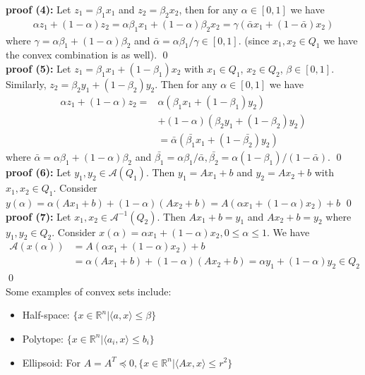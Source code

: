 \documentclass[12pt,a4paper]{article}
\begin{document}
	\textbf{proof (4):} Let $z_1 = \beta_1x_1$ and $z_2 = \beta_2x_2$, then for any $\alpha \in [0,1]$ we have
	\begin{align*}
		\alpha z_1 + (1 - \alpha)z_2 = \alpha \beta_1x_1 + (1 - \alpha)\beta_2x_2 = \gamma(\bar{\alpha}x_1 + (1 - \bar{\alpha})x_2)
	\end{align*}
	where $\gamma = \alpha \beta_1 + (1 - \alpha)\beta_2$ and $\bar{\alpha} = \alpha \beta_1 / \gamma \in [0,1]$. (since $x_1, x_2 \in Q_1$ we have the convex combination is as well). \qed \\
	\textbf{proof (5):} Let $z_1 = \beta_1x_1 + (1 - \beta_1)x_2$ with $x_1 \in Q_1$, $x_2 \in Q_2$, $\beta \in [0,1]$. Similarly, $z_2 = \beta_2y_1 + (1 - \beta_2)y_2$. Then for any $\alpha \in [0,1]$ we have
	\begin{align*}
		\alpha z_1 + (1 - \alpha)z_2 = &\alpha(\beta_1x_1 + (1 - \beta_1)y_2) \\
		&+ (1 - \alpha)(\beta_2y_1 + (1 - \beta_2)y_2) \\
		&= \bar{\alpha}(\bar{\beta_1}x_1 + (1 - \bar{\beta_2})y_2)
	\end{align*}
	where $\bar{\alpha} = \alpha \beta_1 + ( 1 - \alpha)\beta_2$ and $\bar{\beta_1} = \alpha\beta_1/\bar{\alpha}, \bar{\beta_2} = \alpha(1 - \beta_1)/(1 - \bar{\alpha})$. \qed \\
	\textbf{proof (6):} Let $y_1, y_2 \in \mathcal{A}(Q_1)$. Then $y_1 = Ax_1 + b$ and $y_2 = Ax_2 + b$ with $x_1, x_2 \in Q_1$. Consider $y(\alpha) = \alpha(Ax_1 + b) + (1 - \alpha)(Ax_2 + b) = A(\alpha x_1 + (1 - \alpha)x_2) + b$ \qed \\
	\textbf{proof (7):} Let $x_1, x_2 \in \mathcal{A}^{-1}(Q_2)$. Then $Ax_1 + b = y_1$ and $Ax_2 + b = y_2$ where $y_1, y_2 \in Q_2$.  Consider $x(\alpha) = \alpha x_1 + (1 - \alpha)x_2, 0 \leq \alpha \leq 1$. We have
	\begin{align*}
		\mathcal{A}(x(\alpha)) &= A(\alpha x_1 + ( 1 - \alpha)x_2) + b \\
		&= \alpha(Ax_1 + b) + (1 - \alpha)(Ax_2 + b) = \alpha y_1 + ( 1 - \alpha)y_2 \in Q_2
	\end{align*}
	\qed \\
	Some examples of convex sets include: 
	\begin{itemize}
		\item Half-space: $\{x \in \mathbb{R}^n | \langle a, x \rangle \leq \beta\}$
		\item Polytope: $\{x \in \mathbb{R}^n | \langle a_i, x \rangle \leq b_i\}$
		\item Ellipsoid: For $A = A^T \preceq 0, \{x \in \mathbb{R}^n | \langle Ax, x \rangle \leq r^2\}$
	\end{itemize}
\end{document}
